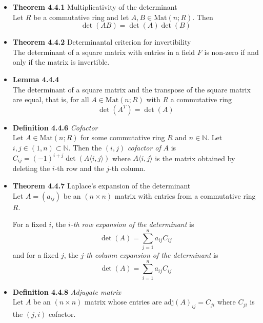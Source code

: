 \documentclass[11pt,a4paper]{article}
\begin{document}
\begin{itemize}
    \item \textbf{Theorem 4.4.1} Multiplicativity of the determinant \\
        Let $R$ be a commutative ring and let $A, B \in \mathrm{Mat}(n; R)$.
        Then
        \[
            \det(A B) = \det(A)\det(B)
        \]

    \item \textbf{Theorem 4.4.2} Determinantal criterion for invertibility \\
        The determinant of a square matrix with entries in a field $F$ is non-zero
        if and only if the matrix is invertible.

    \item \textbf{Lemma 4.4.4} \\
        The determinant of a square matrix and the transpose of the square matrix are equal,
        that is, for all $A \in \mathrm{Mat}(n; R)$ with $R$ a commutative ring
        \[
            \det(A^T) = \det(A)
        \]

    \item \textbf{Definition 4.4.6} \emph{Cofactor} \\
        Let $A \in \mathrm{Mat}(n; R)$ for some commutative ring $R$ and $n \in \mathbb{N}$.
        Let $i, j \in (1,n) \subset \mathbb{N}$.
        Then the $(i, j)$ \emph{cofactor of} $A$ is
        $C_{ij} = {(-1)}^{i+j} \det(A \langle i, j \rangle)$
        where $A \langle i, j \rangle$ is the matrix obtained by deleting the $i$-th row and the
        $j$-th column.

    \item \textbf{Theorem 4.4.7} Laplace's expansion of the determinant \\
        Let $A = (a_{ij})$ be an $(n \times n)$ matrix with entries from a commutative ring $R$.

        For a fixed $i$, the \emph{$i$-th row expansion of the determinant} is
        \[
            \det(A) = \sum_{j=1}^n a_{ij} C_{ij}
        \]
        and for a fixed $j$, the \emph{$j$-th column expansion of the determinant} is
        \[
            \det(A) = \sum_{i=1}^n a_{ij} C_{ij}
        \]

    \item \textbf{Definition 4.4.8} \emph{Adjugate matrix} \\
        Let $A$ be an $(n \times n)$ matrix whose entries are
        $\mathrm{adj}{
        (A)}_{ij} = C_{ji}$ where $C_{ji}$ is the $(j, i)$ cofactor.


\end{itemize}
\end{document}
